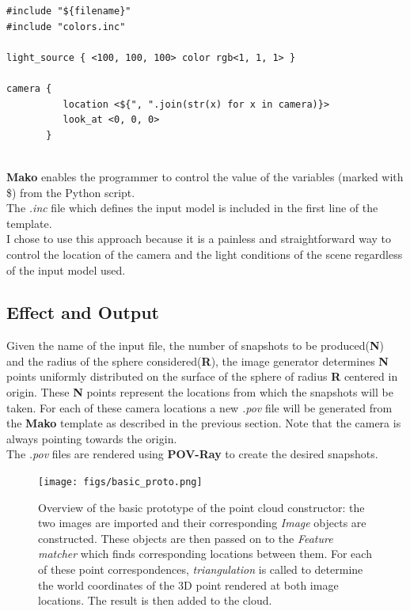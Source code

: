 \documentclass[12pt,a4paper,twoside,openright]{report}
\begin{document}
\begin{verbatim}
#include "${filename}"
#include "colors.inc"

light_source { <100, 100, 100> color rgb<1, 1, 1> }

camera {
          location <${", ".join(str(x) for x in camera)}>
          look_at <0, 0, 0>
       }
\end{verbatim} \\

\textbf{Mako} enables the programmer to control the value of the variables (marked with \$) from the Python script. \\
The \textit{.inc} file which defines the input model is included in the first line of the template. \\
I chose to use this approach because it is a painless and straightforward way to control the location of the camera and the light conditions of the scene regardless of the input model used. 

\subsection{Effect and Output}
Given the name of the input file, the number of snapshots to be produced(\textbf{N}) and the radius of the sphere considered(\textbf{R}), the image generator determines \textbf{N} points uniformly distributed on the surface of the sphere of radius \textbf{R} centered in origin. These \textbf{N} points represent the locations from which the snapshots will be taken. For each of these camera locations a new \textit{.pov} file will be generated from the \textbf{Mako} template as described in the previous section. Note that the camera is always pointing towards the origin. \\
The \textit{.pov} files are rendered using \textbf{POV-Ray} to create the desired snapshots.


\begin{figure}
\centerline{\texttt{[image: figs/basic\_proto.png]}}
\caption{Overview of the basic prototype of the point cloud constructor: the two images are imported and their corresponding \emph{Image} objects are constructed. These objects are then passed on to the \emph{Feature matcher} which finds corresponding locations between them. For each of these point correspondences, \emph{triangulation} is called to determine the world coordinates of the 3D point rendered at both image locations. The result is then added to the cloud.}
\end{figure}
\end{document}
